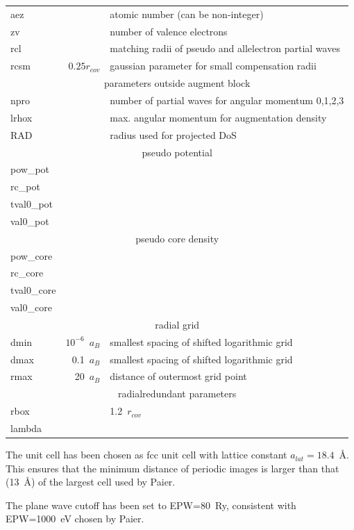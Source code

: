 \documentclass[11pt,a4paper]{report}
\begin{document}
\begin{tabular}{|l|r|l|}
\hline
aez        & & atomic number (can be non-integer) \\
zv         & & number of valence electrons   \\
rcl        & & matching radii of pseudo and allelectron partial waves\\
rcsm       & $0.25 r_{cov}$& gaussian parameter for small compensation radii\\
\hline
\multicolumn{3}{|c|}{parameters outside augment block}\\
\hline
npro       &     & number of partial waves for angular momentum 0,1,2,3\\
lrhox      &     & max. angular momentum for augmentation density\\
RAD        &     & radius used for projected DoS\\
\hline
\multicolumn{3}{|c|}{pseudo potential}\\
\hline
pow\_pot   & & \\
rc\_pot    & & \\
tval0\_pot & & \\
val0\_pot  & & \\
\hline
\multicolumn{3}{|c|}{pseudo core density}\\
\hline
pow\_core  & & \\
rc\_core   & & \\
tval0\_core& & \\
val0\_core & & \\
\hline
\multicolumn{3}{|c|}{radial grid}\\
\hline
dmin       & $10^{-6}$~$a_B$& smallest spacing of shifted logarithmic grid\\
dmax       & 0.1~$a_B$ & smallest spacing of shifted logarithmic grid\\
rmax       & 20~$a_B$ & distance of outermost grid point \\
\hline
\multicolumn{3}{|c|}{radialredundant parameters}\\
\hline
rbox   & & 1.2~$r_{cov}$\\
lambda & & \\
\hline
\end{tabular}

The unit cell has been chosen as fcc unit cell with lattice constant
$a_{lat}=18.4$~\AA. This ensures that the minimum distance of periodic
images is larger than that (13~\AA) of the largest cell used by
Paier\cite{paier05_jcp122_23410}.

The plane wave cutoff has been set to EPW=80~Ry, consistent with
EPW=1000~eV chosen by Paier.
\end{document}
